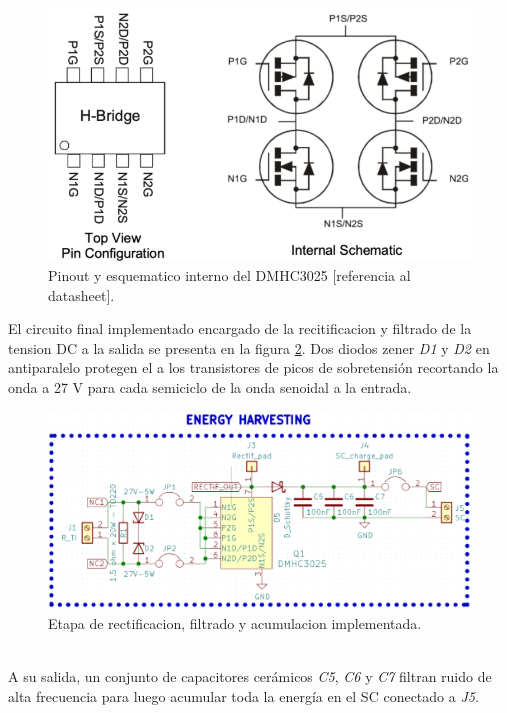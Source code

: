\begin{figure}[h]
	\centering
	\includegraphics[width=0.8\linewidth]{Figures/esquematico_interno_rctificador_mosfet}
	\caption{Pinout y esquematico interno del DMHC3025 [referencia al datasheet].}
	\label{fig:esquematicointernorctificadormosfet}
\end{figure}
El circuito final implementado encargado de la recitificacion y filtrado de la tension DC a la salida se presenta en la figura \ref{fig:ctorectificacionfiltrado}. Dos diodos zener \textit{D1} y \textit{D2} en antiparalelo protegen el a los transistores  de picos de sobretensión recortando la onda a 27 V para cada semiciclo de la onda senoidal a la entrada.\\
\begin{figure}
	\centering
	\includegraphics[width=0.8\linewidth]{Figures/cto_rectificacion_filtrado}
	\caption{Etapa de rectificacion, filtrado y acumulacion implementada.}
	\label{fig:ctorectificacionfiltrado}
\end{figure}\\
A su salida, un conjunto de capacitores cerámicos \textit{C5}, \textit{C6} y \textit{C7} filtran ruido de alta frecuencia para luego acumular toda la energía en el SC conectado a \textit{J5}.\\

